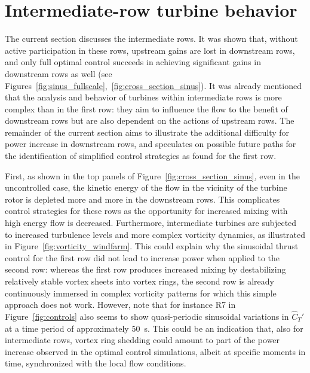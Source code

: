 \documentclass[wes, manuscript]{copernicus}
\newcommand{\cthat}{\widehat{C}_T'}
\begin{document}
\section{Intermediate-row turbine behavior}\label{sec:analysis_intermediate}
The current section discusses the intermediate rows. It was shown that, without active participation in these rows, upstream gains are lost in downstream rows, and only full optimal control succeeds in achieving significant gains in downstream rows as well (see Figures~\ref{fig:sinus_fullscale},~\ref{fig:cross_section_sinus}). It was already mentioned that the analysis and behavior of turbines within intermediate rows is more complex than in the first row: they aim to influence the flow to the benefit of downstream rows but are also dependent on the actions of upstream rows. The remainder of the current section aims to illustrate the additional difficulty for power increase in downstream rows, and speculates on possible future paths for the identification of simplified control strategies as found for the first row.

First, as shown in the top panels of Figure~\ref{fig:cross_section_sinus}, even in the uncontrolled case, the kinetic energy of the flow in the vicinity of the turbine rotor is depleted more and more in the downstream rows. This complicates control strategies for these rows as the opportunity for increased mixing with high energy flow is decreased. Furthermore, intermediate turbines are subjected to increased turbulence levels and more complex vorticity dynamics, as illustrated in Figure~\ref{fig:vorticity_windfarm}. This could explain why the sinusoidal thrust control for the first row did not lead to increase power when applied to the second row: whereas the first row produces increased mixing by destabilizing relatively stable vortex sheets into vortex rings, the second row is already continuously immersed in complex vorticity patterns for which this simple approach does not work. 
However, note that for instance R7 in Figure~\ref{fig:controls} also seems to show quasi-periodic sinusoidal variations in $\cthat$ at a time period of approximately 50~s. This could be an indication that, also for intermediate rows, vortex ring shedding could amount to part of the power increase observed in the optimal control simulations, albeit at specific moments in time, synchronized with the local flow conditions.
\end{document}

